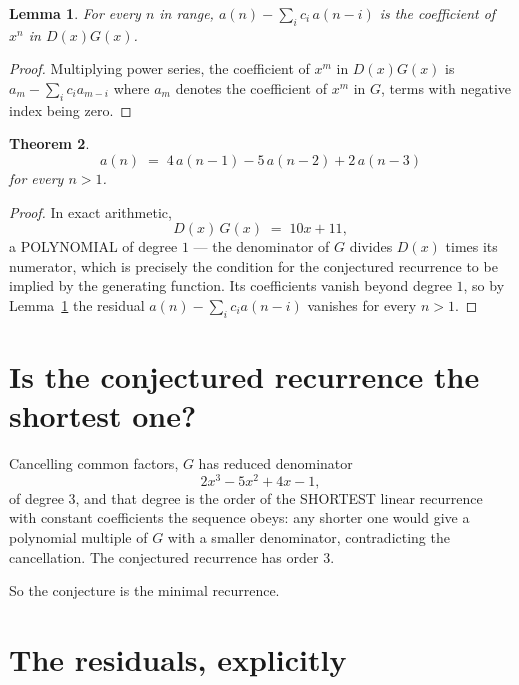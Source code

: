 \documentclass[11pt,a4paper]{article}
\theoremstyle{plain}
\newtheorem{theorem}{Theorem}
\newtheorem{lemma}[theorem]{Lemma}
\theoremstyle{definition}
\begin{document}
\begin{lemma}\label{lem:key}
For every $n$ in range, $a(n)-\sum_i c_i\,a(n-i)$ is the coefficient of $x^{n}$ in
$D(x)G(x)$.
\end{lemma}

\begin{proof}
Multiplying power series, the coefficient of $x^{m}$ in $D(x)G(x)$ is
$a_m-\sum_i c_i a_{m-i}$ where $a_m$ denotes the coefficient of $x^{m}$ in $G$, terms with
negative index being zero.
\end{proof}

\begin{theorem}
\[
a(n)\;=\;4\,a(n-1) - 5\,a(n-2) + 2\,a(n-3)
\]
for every $n>1$.
\end{theorem}

\begin{proof}
In exact arithmetic,
\[
D(x)\,G(x)\;=\;10 x + 11,
\]
a POLYNOMIAL of degree $1$ --- the denominator of $G$ divides $D(x)$ times its numerator,
which is precisely the condition for the conjectured recurrence to be implied by the
generating function. Its coefficients vanish beyond degree $1$, so by
Lemma~\ref{lem:key} the residual $a(n)-\sum_ic_ia(n-i)$ vanishes for every
$n>1$.
\end{proof}

\section{Is the conjectured recurrence the shortest one?}

Cancelling common factors, $G$ has reduced denominator
\[
2 x^{3} - 5 x^{2} + 4 x - 1,
\]
of degree $3$, and that degree is the order of the SHORTEST linear recurrence with
constant coefficients the sequence obeys: any shorter one would give a polynomial multiple of
$G$ with a smaller denominator, contradicting the cancellation. The conjectured recurrence has
order $3$.

So the conjecture is the minimal recurrence.

\section{The residuals, explicitly}
\end{document}
